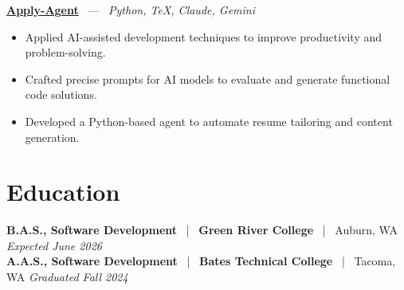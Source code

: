\documentclass[10pt, letterpaper]{article}
\newcommand{\jobhead}[4]{%
  \vspace{5pt}%
  {\bfseries\color{dark}#1}%
  ~{\color{light}|}~%
  {\bfseries\color{navy}#2}%
  ~{\color{light}|}~%
  {\color{light}#3}%
  \hfill{\color{light}\small\textit{#4}}\\[-2pt]%
}
\newcommand{\projhead}[3]{%
  \vspace{5pt}%
  {\bfseries\color{dark}\href{#2}{#1}}%
  ~{\color{light}---}~%
  {\color{light}\small\textit{#3}}\\[-2pt]%
}
\begin{document}
\projhead{Apply-Agent}{https://github.com/timmyd4/apply-agent}{Python, TeX, Claude, Gemini}
\begin{itemize}
  \item Applied AI-assisted development techniques to improve productivity and problem-solving.
  \item Crafted precise prompts for AI models to evaluate and generate functional code solutions.
  \item Developed a Python-based agent to automate resume tailoring and content generation.
\end{itemize}

\section{Education}

\jobhead{B.A.S., Software Development}{Green River College}{Auburn, WA}{Expected June 2026}
\jobhead{A.A.S., Software Development}{Bates Technical College}{Tacoma, WA}{Graduated Fall 2024}
\end{document}
